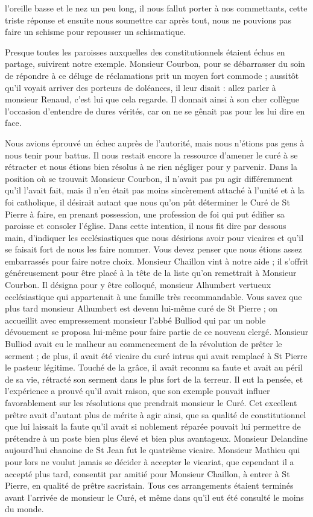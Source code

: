 \documentclass[11pt,a4paper]{report}
\begin{document}
l'oreille basse et le nez un peu long, il nous fallut porter à nos commettants, cette triste réponse et ensuite nous soumettre car après tout, nous ne pouvions pas faire un schisme pour repousser un schismatique.

Presque toutes les paroisses auxquelles des constitutionnels étaient échus en partage, suivirent notre exemple. Monsieur Courbon, pour se débarrasser du soin de répondre à ce déluge de réclamations prit un moyen fort commode ; aussitôt qu'il voyait arriver des porteurs de doléances, il leur disait : allez parler à monsieur Renaud, c'est lui que cela regarde. Il donnait ainsi à son cher collègue l'occasion d'entendre de dures vérités, car on ne se gênait pas pour les lui dire en face.

Nous avions éprouvé un échec auprès de l'autorité, mais nous n'étions pas gens à nous tenir pour battus. Il nous restait encore la ressource d'amener le curé à se rétracter et nous étions bien résolus à ne rien négliger pour y parvenir. Dans la position où se trouvait Monsieur Courbon, il n'avait pas pu agir différemment qu'il l'avait fait, mais il n'en était pas moins sincèrement attaché à l'unité et à la foi catholique, il désirait autant que nous qu'on pût déterminer le Curé de St Pierre à faire, en prenant possession, une profession de foi qui put édifier sa paroisse et consoler l'église. Dans cette intention, il nous fit dire par dessous main, d'indiquer les ecclésiastiques que nous désirions avoir pour vicaires et qu'il se faisait fort de nous les faire nommer. Vous devez penser que nous étions assez embarrassés pour faire notre choix. Monsieur Chaillon vint à notre aide ; il s'offrit généreusement pour être placé à la tête de la liste qu'on remettrait à Monsieur Courbon. Il désigna pour y être colloqué, monsieur Alhumbert vertueux ecclésiastique qui appartenait à une famille très recommandable. Vous savez que plus tard monsieur Alhumbert est devenu lui-même curé de St Pierre ; on accueillit avec empressement monsieur l'abbé Bulliod qui par un noble dévouement se proposa lui-même pour faire partie de ce nouveau clergé. Monsieur Bulliod avait eu le malheur au commencement de la révolution de prêter le serment ; de plus, il avait été vicaire du curé intrus qui avait remplacé à St Pierre le pasteur légitime. Touché de la grâce, il avait reconnu sa faute et avait au péril de sa vie, rétracté son serment dans le plus fort de la terreur. Il eut la pensée, et l'expérience a prouvé qu'il avait raison, que son exemple pouvait influer favorablement sur les résolutions que prendrait monsieur le Curé. Cet excellent prêtre avait d'autant plus de mérite à agir ainsi, que sa qualité de constitutionnel que lui laissait la faute qu'il avait si noblement réparée pouvait lui permettre de prétendre à un poste bien plus élevé et bien plus avantageux. Monsieur Delandine aujourd'hui chanoine de St Jean fut le quatrième vicaire. Monsieur Mathieu qui pour lors ne voulut jamais se décider à accepter le vicariat, que cependant il a accepté plus tard, consentit par amitié pour Monsieur Chaillon, à entrer à St Pierre, en qualité de prêtre sacristain. Tous ces arrangements étaient terminés avant l'arrivée de monsieur le Curé, et même dans qu'il eut été consulté le moins du monde. 
\end{document}
